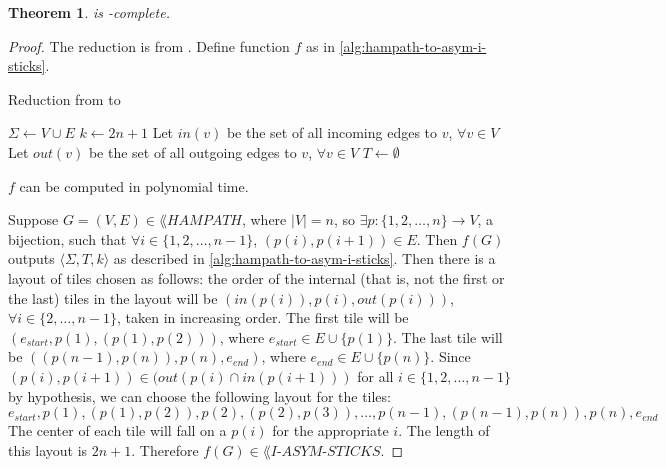 \documentclass[draft]{article}
\newtheorem{theorem}{Theorem}[section]
\theoremstyle{definition} \newtheorem{definition}[definition]{Definition}
\newcommand{\dash}{\mbox{-}}
\newcommand{\triple}[3]{\langle#1,#2,#3\rangle} %
\newcommand{\aisticks}{I\dash ASYM\dash STICKS}
\begin{document}
  \begin{theorem}\label{thm:asym-i-sticks-npc}
    \lang{\aisticks} is \NP-complete.
  \end{theorem}
  \begin{proof}
    The reduction is from . Define function $f$ as in
    \autoref{alg:hampath-to-asym-i-sticks}.
    \begin{algorithm}\label{alg:hampath-to-asym-i-sticks}
      \caption{Reduction from  to \lang{\aisticks}}
      $\Sigma\gets V\cup E$\;
      $k\gets 2n+1$\;
      Let $in(v)$ be the set of all incoming edges to $v$, $\forall v\in V$\;
      Let $out(v)$ be the set of all outgoing edges to $v$, $\forall v\in V$\;
      $T\gets\emptyset$\;
      \Return{$\triple{\Sigma}{T}{k}$}
    \end{algorithm}
    $f$ can be computed in polynomial time.

    Suppose $G=(V,E)\in\lang{HAMPATH}$, where $|V| = n$, so $\exists
    p\colon\{1,2,\ldots,n\}\to V$, a bijection, such that $\forall
    i\in\{1,2,\ldots,n-1\}$, $(p(i), p(i+1))\in E$. Then $f(G)$ outputs
    $\triple{\Sigma}{T}{k}$ as described in
    \autoref{alg:hampath-to-asym-i-sticks}. Then there is a layout of tiles
    chosen as follows: the order of the internal (that is, not the first or the
    last) tiles in the layout will be $(in(p(i)), p(i), out(p(i)))$, $\forall
    i\in\{2,\ldots, n-1\}$, taken in increasing order. The first tile will be
    $(e_{start}, p(1), (p(1),p(2)))$, where $e_{start}\in E\cup\{p(1)\}$. The
    last tile will be $((p(n-1), p(n)), p(n), e_{end})$, where $e_{end}\in
    E\cup\{p(n)\}$. Since $(p(i),p(i+1))\in(out(p(i)\cap in(p(i+1)))$ for all
    $i\in\{1,2,\ldots,n-1\}$ by hypothesis, we can choose the following layout
    for the tiles:
    \begin{displaymath}
      e_{start}, p(1), (p(1), p(2)), p(2), (p(2), p(3)), \ldots, p(n-1),
      (p(n-1), p(n)), p(n), e_{end}
    \end{displaymath}
    The center of each tile will fall on a $p(i)$ for the appropriate $i$. The
    length of this layout is $2n+1$. Therefore $f(G)\in\lang{\aisticks}$.


\end{proof}
\end{document}
